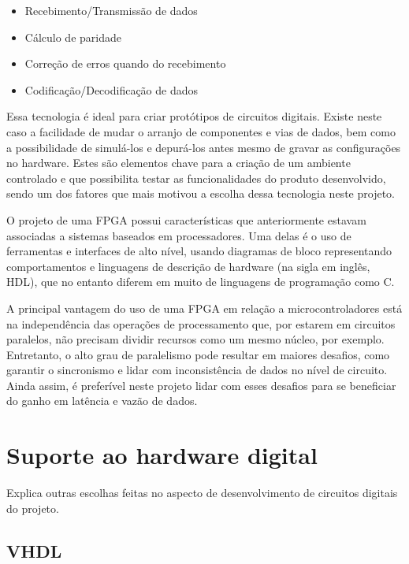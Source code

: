 	\begin{itemize}  
		\item Recebimento/Transmissão de dados
		\item Cálculo de paridade
		\item Correção de erros quando do recebimento
		\item Codificação/Decodificação de dados
	\end{itemize}
	
	Essa tecnologia é ideal para criar protótipos de circuitos digitais. Existe neste caso a facilidade de mudar o arranjo de componentes e vias de dados, bem como a possibilidade de simulá-los e depurá-los antes mesmo de gravar as configurações no hardware. Estes são elementos chave para a criação de um ambiente controlado e que possibilita testar as funcionalidades do produto desenvolvido, sendo um dos fatores que mais motivou a escolha dessa tecnologia neste projeto.
	
	O projeto de uma FPGA possui características que anteriormente estavam associadas a sistemas baseados em processadores. Uma delas é o uso de ferramentas e interfaces de alto nível, usando diagramas de bloco representando comportamentos e linguagens de descrição de hardware (na sigla em inglês, HDL), que no entanto diferem em muito de linguagens de programação como C. 
	
	A principal vantagem do uso de uma FPGA em relação a microcontroladores está na independência das operações de processamento que, por estarem em circuitos paralelos, não precisam dividir recursos como um mesmo núcleo, por exemplo. Entretanto, o alto grau de paralelismo pode resultar em maiores desafios, como garantir o sincronismo e lidar com inconsistência de dados no nível de circuito. Ainda assim, é preferível neste projeto lidar com esses desafios para se beneficiar do ganho em latência e vazão de dados.

	\section{Suporte ao hardware digital}\label{sec-software}
	
	Explica outras escolhas feitas no aspecto de desenvolvimento de circuitos digitais do projeto.
	
	\subsection{VHDL}\label{soft-vhdl}
	
